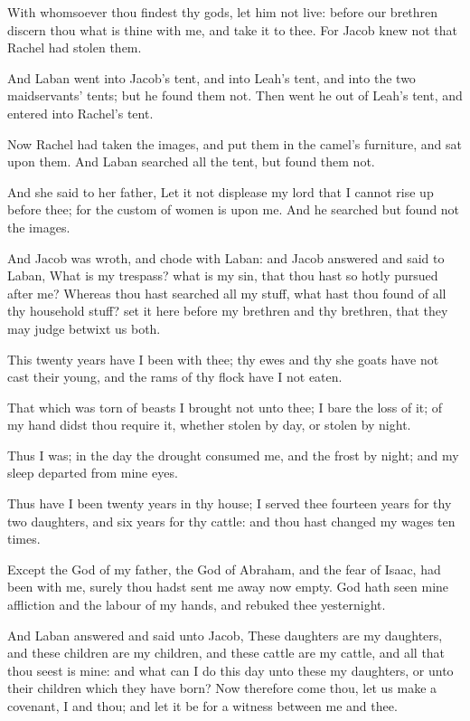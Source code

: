 \Verse With whomsoever thou findest thy gods, let him not live: before our brethren discern thou what is thine with me, and take it to thee.  For Jacob knew not that Rachel had stolen them.

\Verse And Laban went into Jacob's tent, and into Leah's tent, and into the two maidservants' tents; but he found them not. Then went he out of Leah's tent, and entered into Rachel's tent.

\Verse Now Rachel had taken the images, and put them in the camel's furniture, and sat upon them. And Laban searched all the tent, but found them not.

\Verse And she said to her father, Let it not displease my lord that I cannot rise up before thee; for the custom of women is upon me. And he searched but found not the images.

\Verse And Jacob was wroth, and chode with Laban: and Jacob answered and said to Laban, What is my trespass? what is my sin, that thou hast so hotly pursued after me?  \Verse Whereas thou hast searched all my stuff, what hast thou found of all thy household stuff? set it here before my brethren and thy brethren, that they may judge betwixt us both.

\Verse This twenty years have I been with thee; thy ewes and thy she goats have not cast their young, and the rams of thy flock have I not eaten.

\Verse That which was torn of beasts I brought not unto thee; I bare the loss of it; of my hand didst thou require it, whether stolen by day, or stolen by night.

\Verse Thus I was; in the day the drought consumed me, and the frost by night; and my sleep departed from mine eyes.

\Verse Thus have I been twenty years in thy house; I served thee fourteen years for thy two daughters, and six years for thy cattle: and thou hast changed my wages ten times.

\Verse Except the God of my father, the God of Abraham, and the fear of Isaac, had been with me, surely thou hadst sent me away now empty. God hath seen mine affliction and the labour of my hands, and rebuked thee yesternight.

\Verse And Laban answered and said unto Jacob, These daughters are my daughters, and these children are my children, and these cattle are my cattle, and all that thou seest is mine: and what can I do this day unto these my daughters, or unto their children which they have born?  \Verse Now therefore come thou, let us make a covenant, I and thou; and let it be for a witness between me and thee.

